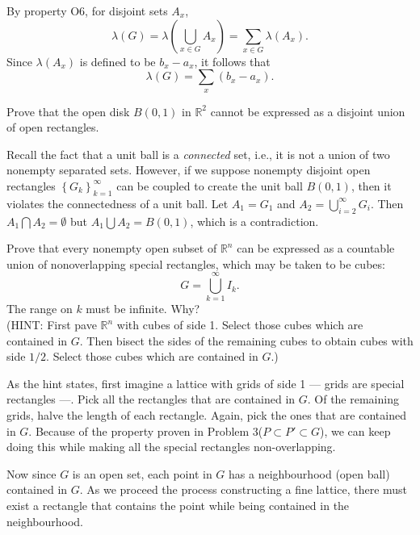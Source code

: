 \documentclass[answers]{exam}
\begin{document}
\begin{questions}
   \begin{solution}
      By property O6, for disjoint sets $A_{x}$,
      $$
         \lambda\left(G\right) = \lambda\left(\bigcup_{x\in G}A_{x}\right) = \sum_{x\in G}\lambda\left(A_{x}\right).
      $$
      Since $\lambda\left(A_{x}\right)$ is defined to be $b_{x} - a_{x}$, it follows that
      $$
         \lambda\left(G\right) = \sum_{x}\left(b_{x}-a_{x}\right).
      $$
   \end{solution}
   \question
   Prove that the open disk $B\left(0,1\right)$ in $\mathbb{R}^{2}$ cannot be expressed as a disjoint union of open rectangles.
   \begin{solution}
      Recall the fact that a unit ball is a \emph{connected} set, i.e., it is not a union of two nonempty separated sets. However, if we suppose nonempty disjoint open rectangles $\left\{G_{k} \right\}_{k=1}^{\infty}$ can be coupled to create the unit ball $B\left(0,1\right)$, then it violates the connectedness of a unit ball. Let $A_{1} = G_{1}$ and $A_{2} = \bigcup_{i=2}^{\infty} G_{i}$. Then $A_{1} \bigcap A_{2} = \emptyset$ but $A_{1} \bigcup A_{2} = B\left(0,1\right)$, which is a contradiction.
   \end{solution}

   \question
   Prove that every nonempty open subset of $\mathbb{R}^{n}$ can be expressed as a countable union of nonoverlapping special rectangles, which may be taken to be cubes:
   $$
      G = \bigcup_{k=1}^{\infty}I_{k}.
   $$
   The range on $k$ must be infinite. Why?\\
   (HINT: First pave $\mathbb{R}^{n}$ with cubes of side 1. Select those cubes which are contained in $G$. Then bisect the sides of the remaining cubes to obtain cubes with side $1/2$. Select those cubes which are contained in $G$.)
   \begin{solution}
      As the hint states, first imagine a lattice with grids of side 1 --- grids are special rectangles ---. Pick all the rectangles that are contained in $G$. Of the remaining grids, halve the length of each rectangle. Again, pick the ones that are contained in $G$. Because of the property proven in Problem 3($P \subset P' \subset G$), we can keep doing this while making all the special rectangles non-overlapping.\par
      Now since $G$ is an open set, each point in $G$ has a neighbourhood (open ball) contained in $G$. As we proceed the process constructing a fine lattice, there must exist a rectangle that contains the point while being contained in the neighbourhood. 
   \end{solution}
   

\end{questions}
\end{document}
